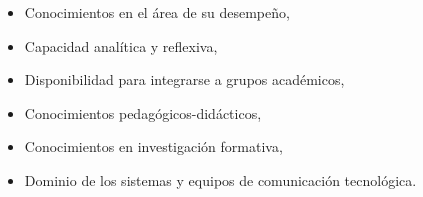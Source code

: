 \begin{itemize}
\item Conocimientos en el área de su desempeño,
\item Capacidad analítica y reflexiva,
\item Disponibilidad para integrarse a grupos académicos,
\item Conocimientos pedagógicos-didácticos,
\item Conocimientos en investigación formativa,
\item Dominio de los sistemas y equipos de comunicación tecnológica.
\end{itemize}